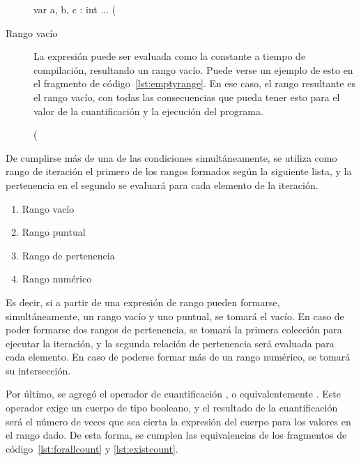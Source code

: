 \begin{description}
\begin{gracielacode}[caption=Cuantificación con rango puntual, label=lst:pointrange]
var a, b, c : int
...
(%
\end{gracielacode}

  \item [Rango vacío] La expresión puede ser evaluada como la constante
   a tiempo de compilación, resultando un rango vacío. Puede verse
  un ejemplo de esto en el fragmento de código~\ref{lst:emptyrange}. En ese
  caso, el rango resultante es el rango vacío, con todas las consecuencias que
  pueda tener esto para el valor de la cuantificación y la ejecución del
  programa.

\begin{gracielacode}[caption=Cuantificación con rango puntual, label=lst:emptyrange]
(%
\end{gracielacode}

\end{description}

De cumplirse más de una de las condiciones simultáneamente, se utiliza como
rango de iteración el primero de los rangos formados según la siguiente lista, y
la pertenencia en el segundo se evaluará para cada elemento de la iteración.

\begin{enumerate}
  \item Rango vacío
  \item Rango puntual
  \item Rango de pertenencia
  \item Rango numérico
\end{enumerate}

Es decir, si a partir de una expresión de rango pueden formarse,
simultáneamente, un rango vacío y uno puntual, se tomará el vacío. En caso de
poder formarse dos rangos de pertenencia, se tomará la primera colección para
ejecutar la iteración, y la segunda relación de pertenencia será evaluada para
cada elemento. En caso de poderse formar más de un rango numérico, se tomará su
intersección.

Por último, se agregó el operador de cuantificación , o
equivalentemente \ingra{#}. Este operador exige un cuerpo de tipo booleano, y el
resultado de la cuantificación será el número de veces que sea cierta la
expresión del cuerpo para los valores en el rango dado. De esta forma, se
cumplen las equivalencias de los fragmentos de código~\ref{lst:forallcount} y
\ref{lst:existcount}.

